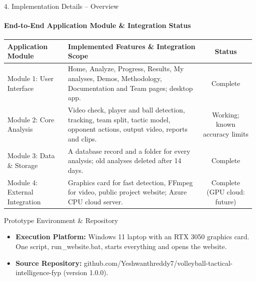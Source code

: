 \documentclass[aspectratio=169, 11pt]{beamer}
\begin{document}
\begin{frame}{4. Implementation Details -- Overview}
    \framesubtitle{End-to-End Application Module \& Integration Status}
\begin{table}
    \centering
    \scriptsize
    \renewcommand{\arraystretch}{1.2}
    \begin{tabular}{p{3.2cm} p{7.4cm} c}
        \toprule
        \textbf{Application Module} & \textbf{Implemented Features \& Integration Scope} & \textbf{Status} \\
        \midrule
Module 1: User Interface & Home, Analyze, Progress, Results, My analyses, Demos, Methodology, Documentation and Team pages; desktop app. & Complete \\
Module 2: Core Analysis & Video check, player and ball detection, tracking, team split, tactic model, opponent actions, output video, reports and clips. & Working; known accuracy limits \\
Module 3: Data \& Storage & A database record and a folder for every analysis; old analyses deleted after 14 days. & Complete \\
Module 4: External Integration & Graphics card for fast detection, FFmpeg for video, public project website; Azure CPU cloud server. & Complete (GPU cloud: future) \\
        \bottomrule
    \end{tabular}
\end{table}
\begin{block}{Prototype Environment \& Repository}
\scriptsize
\begin{itemize}
  \item \textbf{Execution Platform:} Windows 11 laptop with an RTX 3050 graphics card. One script, run\_website.bat, starts everything and opens the website.
  \item \textbf{Source Repository:} github.com/Yeshwanthreddy7/volleyball-tactical-intelligence-fyp (version 1.0.0).
\end{itemize}
\end{block}
\end{frame}
\end{document}
